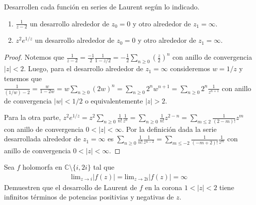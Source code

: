 \documentclass{article}
\newcommand{\C}{\mathbb{C}}
\newenvironment{theorem}[2][Ejercicio]{\begin{trivlist}
\item[\hskip\labelsep{\bfseries #1}\hskip\labelsep{\bfseries #2.}]}{\end{trivlist}}
\begin{document}
\begin{theorem}{11}
    Desarrollen cada función en series de Laurent según lo indicado.\begin{enumerate}
        \item \( \frac{1}{z-2} \) un desarrollo alrededor de \( z_0 = 0 \) y otro alrededor de \( z_1 = \infty \).
        \item \( z^2 e^{1/z} \) un desarrollo alrededor de \( z_0 = 0 \) y otro alrededor de \( z_1 = \infty \).
    \end{enumerate}
\end{theorem}

\begin{proof}
    Notemos que \( \frac{1}{z-2} = \frac{-1}{2} \frac{1}{1 - z/2} = - \frac{1}{2} \sum_{n \geq 0} {\left( \frac{z}{2} \right)}^n \) con anillo de convergencia \( |z| < 2 \).
    Luego, para el desarrollo alrededor de \( z_1 = \infty \) consideremos \( w = 1/z \) y tenemos que \( \frac{1}{(1/w) - 2} = \frac{w}{1 - 2w} = w \sum_{n \geq 0} {(2w)}^n = \sum_{n \geq 0} 2^n w^{n+1} = \sum_{n \geq 0} 2^n \frac{1}{z^{n+1}} \)
    con anillo de convergencia \( |w| < 1/2 \) o equivalentemente \( |z| > 2 \).

    Para la otra parte, \( z^2 e^{1/z} = z^2 \sum_{n \geq 0} \frac{1}{n!} \frac{1}{z^n} = \sum_{n \geq 0} \frac{1}{n!} z^{2-n} = \sum_{m \leq 2} \frac{1}{(2-m)!} z^m \) con anillo de convergencia \( 0 < |z| < \infty \).
    Por la definición dada la serie desarrollada alrededor de \( z_1 = \infty \) es \( \sum_{n \geq 0} \frac{1}{n!} \frac{1}{z^{n-2}} = \sum_{m \leq -2} \frac{1}{(-m+2)!} \frac{1}{z^m} \) con anillo de convergencia \( 0 < |z| < \infty \).
\end{proof}

\vspace{0.25in}

\begin{theorem}{12}
    Sea \( f \) holomorfa en \( \C \setminus \{ i, 2i \} \) tal que \begin{align*}
        \text{lim}_{z \to i} |f(z)| = \text{lim}_{z \to 2i} |f(z)| = \infty
    \end{align*}
    Demuestren que el desarrollo de Laurent de \( f \) en la corona \( 1 < |z| < 2 \) tiene infinitos términos de potencias positivias y negativas de \( z \).
\end{theorem}
\end{document}
